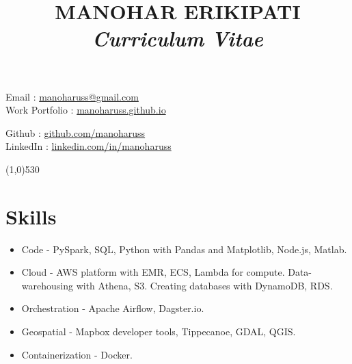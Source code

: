 \documentclass{article}
\title{\bfseries MANOHAR ERIKIPATI \\ \large \textit {Curriculum Vitae}}
\date{}
\begin{document}
\maketitle

\vspace{-8.55em}
\begin{minipage}[ht]{0.58\textwidth}
Email : \href{mailto:manoharuss@gmail.com}{manoharuss@gmail.com} \\
Work Portfolio : \href{https://manoharuss.github.io/}{manoharuss.github.io}
\end{minipage}
\begin{minipage}[ht]{0.58\textwidth}
\hfill \break
\hfill \break
Github : \href{http://github.com/manoharuss}{github.com/manoharuss} \\
LinkedIn : \href{https://www.linkedin.com/in/manoharuss/}{linkedin.com/in/manoharuss} \\
\end{minipage}
\line(1,0){530}

\section*{Skills}
\begin{itemize}[noitemsep]
\item Code - PySpark, SQL, Python with Pandas and Matplotlib, Node.js, Matlab.
\item Cloud - AWS platform with EMR, ECS, Lambda for compute. Data-warehousing with Athena, S3. Creating databases with DynamoDB, RDS.
\item Orchestration - Apache Airflow, Dagster.io.
\item Geospatial - Mapbox developer tools, Tippecanoe, GDAL, QGIS.
\item Containerization - Docker.
\end{itemize}
\end{document}
